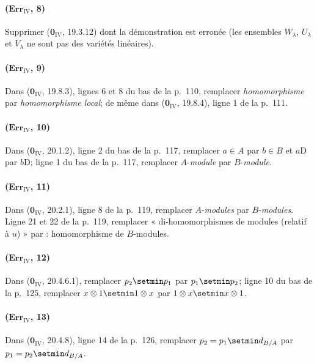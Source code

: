 \paragraph{($\mathbf{Err}_{\mathrm{IV}}$, 8)}
Supprimer ($\mathbf{0}_{\mathrm{IV}}$, 19.3.12) dont la démonstration est erronée
(les ensembles $W_\lambda$, $U_\lambda$ et $V_\lambda$ ne sont pas des
variétés linéaires).

\paragraph{($\mathbf{Err}_{\mathrm{IV}}$, 9)}
Dans ($\mathbf{0}_{\mathrm{IV}}$, 19.8.3), lignes 6 et 8 du bas de la p.~110,
remplacer \emph{homomorphisme} par \emph{homomorphisme local}; de même dans
($\mathbf{0}_{\mathrm{IV}}$, 19.8.4), ligne 1 de la p.~111.

\paragraph{($\mathbf{Err}_{\mathrm{IV}}$, 10)}
Dans ($\mathbf{0}_{\mathrm{IV}}$, 20.1.2), ligne 2 du bas de la p.~117,
remplacer $a\in A$ par $b\in B$ et $a\mathrm{D}$ par $b\mathrm{D}$; ligne 1 du bas de la
p.~117, remplacer $A$-\emph{module} par $B$-\emph{module}.

\paragraph{($\mathbf{Err}_{\mathrm{IV}}$, 11)}
Dans ($\mathbf{0}_{\mathrm{IV}}$, 20.2.1), ligne 8 de la p.~119, remplacer
$A$-\emph{modules} par $B$-\emph{modules}. Ligne 21 et 22 de la p.~119, remplacer
« di-homomorphismes de modules (relatif à $u$) » par : homomorphisme
de $B$-modules.

\paragraph{($\mathbf{Err}_{\mathrm{IV}}$, 12)}
Dans ($\mathbf{0}_{\mathrm{IV}}$, 20.4.6.1), remplacer $p_2\setmin p_1$ par $p_1\setmin p_2$;
ligne 10 du bas de la p.~125, remplacer $x\otimes1\setmin 1\otimes x$ par
$1\otimes x\setmin x\otimes1$.

\paragraph{($\mathbf{Err}_{\mathrm{IV}}$, 13)}
Dans ($\mathbf{0}_{\mathrm{IV}}$, 20.4.8), ligne 14 de la p.~126, remplacer
$p_2=p_1\setmin d_{B/A}$ par $p_1=p_2\setmin d_{B/A}$.

